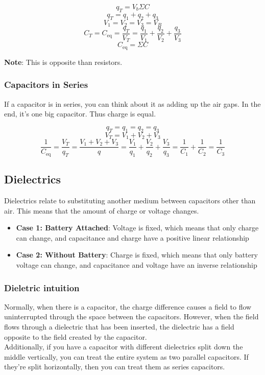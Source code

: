\documentclass{article}
\begin{document}
$$q_T = V_b \Sigma C $$
$$q_T = q_1 + q_2 + q_3$$
$$V_1 = V_2 = V_3 = V_B$$
$$C_T = C_{\text{eq}} = \frac{q_T}{V_T} = \frac{q_1}{V_1} + \frac{q_2}{V_2}  + \frac{q_3}{V_3}$$
$$C_{\text{eq}} = \Sigma C$$

\textbf{Note}: This is opposite than resistors.

\subsubsection{Capacitors in Series}

If a capacitor is in series, you can think about it as adding up the air gaps. In the end, it's one big capacitor. Thus charge is equal.

$$q_T = q_1 = q_2 = q_3$$
$$V_T = V_1 + V_2 + V_3$$
$$\frac{1}{C_{\text{eq}}} = \frac{V_T}{q_T} = \frac{V_1+V_2+V_3}{q} = \frac{V_1}{q_1} + \frac{V_2}{q_2} + \frac{V_3 }{q_3} = \frac{1}{C_1} + \frac{1}{C_2} = \frac{1}{C_3}$$


\subsection{Dielectrics}

Dielectrics relate to substituting another medium between capacitors other than air. This means that the amount of charge or voltage changes.

\begin{itemize}
    \item \textbf{Case 1: Battery Attached}: Voltage is fixed, which means that only charge can change, and capacitance and charge have a positive linear relationship
    \item \textbf{Case 2: Without Battery}: Charge is fixed, which means that only battery voltage can change, and capacitance and voltage have an inverse relationship
\end{itemize}

\subsubsection{Dieletric intuition}

Normally, when there is a capacitor, the charge difference causes a field to flow uninterrupted through the space between the capacitors. However, when the field flows through a dielectric that has been inserted, the dielectric has a field opposite to the field created by the capacitor.\\
Additionally, if you have a capacitor with different dielectrics split down the middle vertically, you can treat the entire system as two parallel capacitors. If they're split horizontally, then you can treat them as series capacitors.
\end{document}
